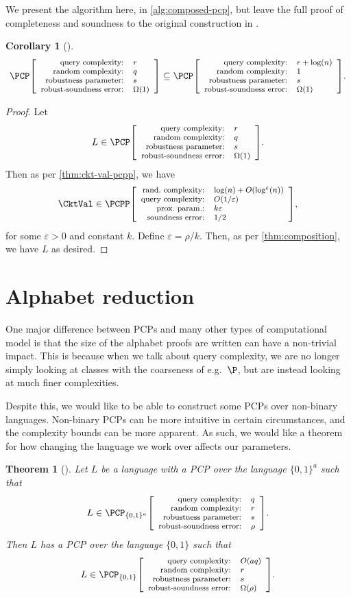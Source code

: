 \documentclass[english,12pt]{reedthesis}
\theoremstyle{plain}
\newtheorem{thm}{Theorem}[section]
\newtheorem{cor}[cor]{Corollary}
\theoremstyle{definition}
\theoremstyle{remark}
\newcommand{\pcpp}[4]{%
  \ensuremath%
  \mleft[{\footnotesize\begin{array}{r l}
    \text{rand.\ complexity:} & #1 \\
    \text{query complexity:} & #2 \\
    \text{prox.\ param.:} & #3 \\
    \text{soundness error:} & #4
  \end{array}}\mright]%
}
\newcommand{\pcpr}[4]{%
  \ensuremath%
  \mleft[{\footnotesize\begin{array}{r l}
    \text{query complexity:} & #1 \\
    \text{random complexity:} & #2 \\
    \text{robustness parameter:} & #3 \\
    \text{robust-soundness error:} & #4
  \end{array}}\mright]%
}
\begin{document}
We present the algorithm here, in \cref{alg:composed-pcp}, but leave the full
proof of completeness and soundness to the original construction in
\cite{BGHSV06}.

\begin{cor}[{\cite[Corollary 3.11]{GOS25}}]\label{cor:constant-query}
  \begin{equation}\label{eqn:constant-query}
    \PCP\pcpr{r}{q}{s}{\Omega(1)} \subseteq
    \PCP\pcpr{r + \log(n)}{1}{s}{\Omega(1)}.
  \end{equation}
\end{cor}

\begin{proof}
  Let
  \begin{equation}
    L \in \PCP\pcpr{r}{q}{s}{\Omega(1)}.
  \end{equation}
  Then as per \cref{thm:ckt-val-pcpp}, we have
  \begin{equation}
    \CktVal \in \PCPP\pcpp{\log(n) + O(\log^{\varepsilon}(n))}{O(1/\varepsilon)}{k\varepsilon}{1/2},
  \end{equation}
  for some $\varepsilon > 0$ and constant $k$. Define $\varepsilon = \rho/k$. Then, as per
  \cref{thm:composition}, we have $L$ as desired.
\end{proof}


\section{Alphabet reduction}\label{sec:alph-reduction}

One major difference between PCPs and many other types of computational model is
that the size of the alphabet proofs are written can have a non-trivial impact.
This is because when we talk about query complexity, we are no longer simply
looking at classes with the coarseness of e.g.\ $\P$, but are instead looking at
much finer complexities.

Despite this, we would like to be able to construct some PCPs over non-binary
languages. Non-binary PCPs can be more intuitive in certain circumstances, and
the complexity bounds can be more apparent. As such, we would like a theorem for
how changing the language we work over affects our parameters.

\begin{thm}[{\cite[Lemma 2.13]{BGHSV06}}]%
  \label{thm:alph-reduction}
  Let $L$ be a language with a PCP over the language $\{0, 1\}^{a}$ such
  that
  \[
    L \in \PCP_{\{0, 1\}^{a}}\pcpr{q}{r}{s}{\rho}.
  \]
  Then $L$ has a PCP over the language $\{0, 1\}$ such that
  \[
    L \in \PCP_{\{0, 1\}}\pcpr{O(aq)}{r}{s}{\Omega(\rho)}.
  \]
\end{thm}
\end{document}
